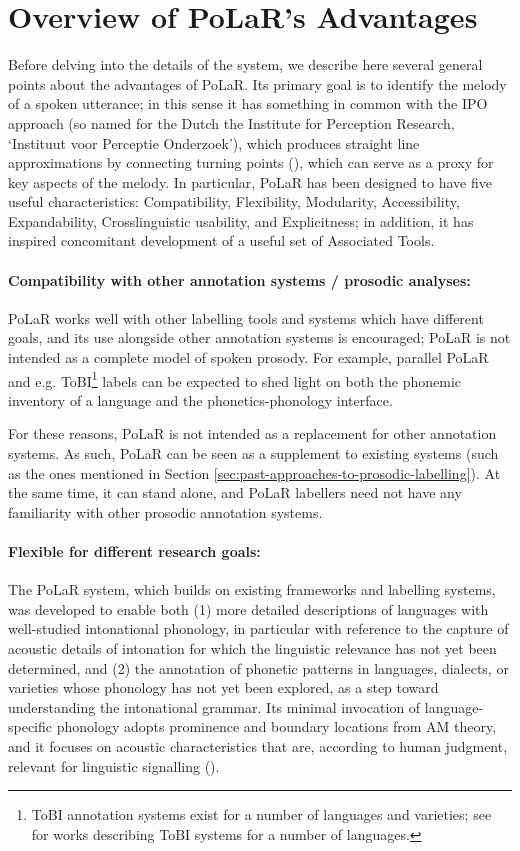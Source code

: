 \section{Overview of PoLaR’s Advantages}\label{sec:overview-of-PoLaRs-advantages}
Before delving into the details of the system, we describe here several general points about the advantages of PoLaR. Its primary goal is to identify the melody of a spoken utterance; in this sense it has something in common with the IPO approach (so named for the Dutch the Institute for Perception Research, ‘Instituut voor Perceptie Onderzoek’), which produces straight line approximations by connecting turning points (\citealt{t-hart-90}), which can serve as a proxy for key aspects of the melody.  In particular, PoLaR has been designed to have five useful characteristics: Compatibility, Flexibility, Modularity, Accessibility, Expandability, Crosslinguistic usability, and Explicitness; in addition, it has inspired concomitant development of a useful set of Associated Tools. 

\paragraph{Compatibility with other annotation systems / prosodic analyses:}
PoLaR works well with other labelling tools and systems which have different goals, and its use alongside other annotation systems is encouraged; PoLaR is not intended as a complete model of spoken prosody.  For example, parallel PoLaR and e.g. ToBI\footnote{ToBI annotation systems exist for a number of languages and varieties; see \citealt{jun05, jun14} for works describing ToBI systems for a number of languages.} labels can be expected to shed light on both the phonemic inventory of a language and the phonetics-phonology interface. 

For these reasons, PoLaR is not intended as a replacement for other annotation systems. As such, PoLaR can be seen as a supplement to existing systems (such as the ones mentioned in Section \ref{sec:past-approaches-to-prosodic-labelling}). At the same time, it can stand alone, and PoLaR labellers need not have any familiarity with other prosodic annotation systems.

\paragraph{Flexible for different research goals:}
The PoLaR system, which builds on existing frameworks and labelling systems, was developed to enable both (1) more detailed descriptions of languages with well-studied intonational phonology, in particular with reference to the capture of acoustic details of intonation for which the linguistic relevance has not yet been determined, and (2) the annotation of phonetic patterns in languages, dialects, or varieties whose phonology has not yet been explored, as a step toward understanding the intonational grammar. Its minimal invocation of language-specific phonology adopts prominence and boundary locations from AM theory, and it focuses on acoustic characteristics that are, according to human judgment, relevant for linguistic signalling (\citealt{barnesshattuckhufnagel20}).   

